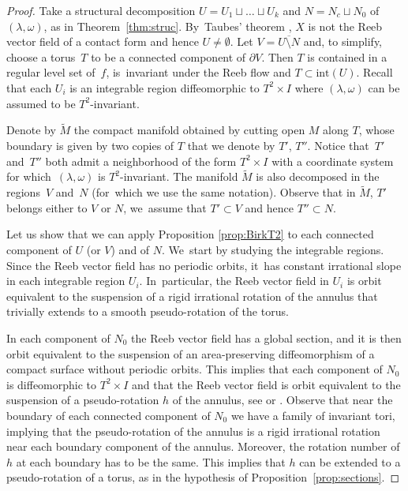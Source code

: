 \begin{proof}
Take a structural decomposition $U=U_1\sqcup \ldots \sqcup U_k$ and $N= N_c \sqcup N_0$ of $(\lambda,\omega)$, as in Theorem~\ref{thm:struc}. By~Taubes' theorem \cite{Taub}, $X$ is not the Reeb vector field of a contact form and hence $U\neq \emptyset$. Let $V=\overline{U\setminus N}$ and, to simplify, choose a torus~$T$ to be a connected component of $\partial V$. Then $T$ is contained in a regular level set of~$f$, is~invariant under the Reeb flow and $T\subset \text{int}(U)$. Recall that each $U_i$ is an integrable region diffeomorphic to $T^2\times I$ where $(\lambda,\omega)$ can be assumed to be $T^2$-invariant.

Denote by $\widetilde{M}$ the compact manifold obtained by cutting open $M$ along $T$, whose boundary is given by two copies of $T$ that we denote by $T'$, $T''$. Notice that~$T'$ and~$T''$ both admit a neighborhood of the form $T^2\times I$ with a coordinate system for which~$(\lambda,\omega)$ is $T^2$-invariant. The manifold $\widetilde M$ is also decomposed in the regions~$V$ and~$N$ (for~which we use the same notation). Observe that in $\widetilde M$, $T'$ belongs either to $V$ or $N$, we~assume that $T'\subset V$ and hence $T''\subset N$.

Let us show that we can apply Proposition \ref{prop:BirkT2} to each connected component of $U$ (or $V$) and of $N$. We~start by studying the integrable regions. Since the Reeb vector field has no periodic orbits, it~has constant irrational slope in each integrable region $U_i$. In~particular, the Reeb vector field in $U_i$ is orbit equivalent to the suspension of a rigid irrational rotation of the annulus that trivially extends to a smooth pseudo-rotation of the torus.

In each component of $N_0$ the Reeb vector field has a global section, and it is then orbit equivalent to the suspension of an area-preserving diffeomorphism of a compact surface without periodic orbits. This implies that each component of $N_0$ is diffeomorphic to $T^2\times I$ and that the Reeb vector field is orbit equivalent to the suspension of a pseudo-rotation $h$ of the annulus, see \cite[p.\,20]{Re} or \cite[\S 5.3]{HT}. Observe that near the boundary of each connected component of $N_0$ we have a family of invariant tori, implying that the pseudo-rotation of the annulus is a rigid irrational rotation near each boundary component of the annulus. Moreover, the rotation number of $h$ at each boundary has to be the same. This implies that $h$ can be extended to a pseudo-rotation of a torus, as in the hypothesis of Proposition~\ref{prop:sections}.


\end{proof}
